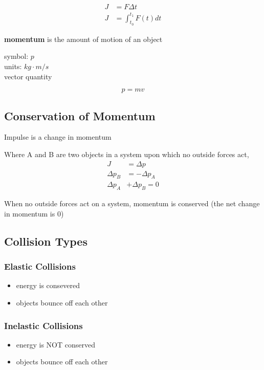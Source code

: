 \documentclass[titlepage]{article}
\begin{document}
\begin{align*}
    J & = F \Delta t               \\
    J & = \int_{t_0}^{t_1} F(t) dt
\end{align*}

\textbf{momentum} is the amount of motion of an object

symbol: $p$\\
units: $kg \cdot m/s$\\
vector quantity

\begin{equation*}
    p = mv
\end{equation*}

\subsection{Conservation of Momentum}
Impulse is a change in momentum

Where A and B are two objects in a system upon which no outside forces act,
\begin{align*}
    J          & = \Delta p       \\
    \Delta p_B & = -\Delta p_A    \\
    \Delta p_A & + \Delta p_B = 0
\end{align*}

When no outside forces act on a system, momentum is conserved (the net change in momentum is 0)

\subsection{Collision Types}
\subsubsection{Elastic Collisions}
\begin{itemize}
    \item energy is consevered
    \item objects bounce off each other
\end{itemize}

\subsubsection{Inelastic Collisions}
\begin{itemize}
    \item energy is NOT conserved
    \item objects bounce off each other
\end{itemize}
\end{document}
